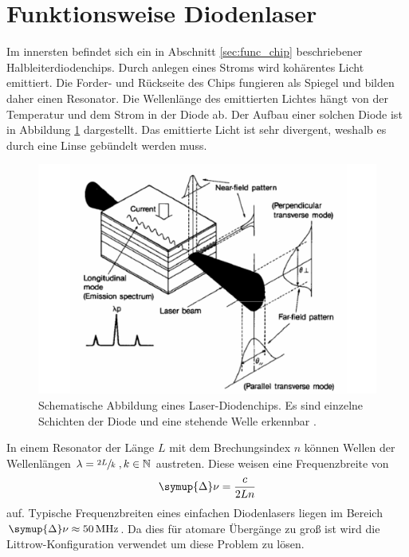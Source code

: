\section{Funktionsweise Diodenlaser}
\label{sec:func_dio}

Im innersten befindet sich ein in Abschnitt \ref{sec:func_chip} beschriebener Halbleiterdiodenchips. Durch anlegen eines Stroms wird kohärentes Licht emittiert. Die Forder- und 
Rückseite des Chips fungieren als Spiegel und bilden daher einen Resonator. Die Wellenlänge des emittierten Lichtes hängt von der Temperatur und dem Strom in der Diode ab. Der
Aufbau einer solchen Diode ist in Abbildung \ref{fig:LDChip} dargestellt. Das emittierte Licht ist sehr divergent, weshalb es durch eine Linse gebündelt werden muss. 

\begin{figure}
    \centering
    \includegraphics[scale=0.4]{bilder/LDChip.png}
    \caption{Schematische Abbildung eines Laser-Diodenchips. Es sind einzelne Schichten der Diode und eine stehende Welle erkennbar \cite{diode_laser_spectroscopy}.}
    \label{fig:LDChip}
\end{figure}

In einem Resonator der Länge $L$ mit dem Brechungsindex $n$ können Wellen der Wellenlängen $\lambda = \sfrac{2L}{k}  \;,k \in \mathbb{N}$ austreten. Diese weisen eine Frequenzbreite 
von 
\begin{equation}
    \label{eqn:delta_nu}
    \symup{\Delta} \nu = \frac{c}{2Ln}
\end{equation}
auf. Typische Frequenzbreiten eines einfachen Diodenlasers liegen im Bereich $\symup{\Delta} \nu \approx \qty{50}{\mega\hertz}$. Da dies für atomare Übergänge zu groß ist wird 
die Littrow-Konfiguration verwendet um diese Problem zu lösen. 

